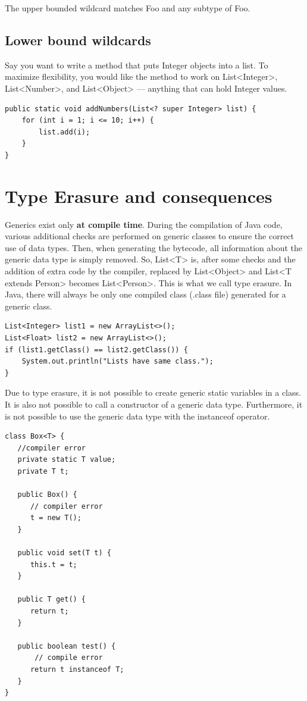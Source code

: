 The upper bounded wildcard matches Foo and any subtype of Foo.

\subsection{Lower bound wildcards}


Say you want to write a method that puts Integer objects into a list. To maximize flexibility, you would like the method to work on List<Integer>, List<Number>, and List<Object> — anything that can hold Integer values.

\begin{lstlisting}
public static void addNumbers(List<? super Integer> list) {
    for (int i = 1; i <= 10; i++) {
        list.add(i);
    }
}
\end{lstlisting}


\section{Type Erasure and consequences}

Generics exist only \textbf{at compile time}. During the compilation of Java code,  various additional checks are performed on generic classes to ensure the correct use of data types. Then, when generating the bytecode, all information about the generic data type is simply removed. So,  List<T> is, after some checks and the addition of extra code by the compiler, replaced by List<Object> and List<T extends Person> becomes List<Person>. This is what we call type erasure.  In Java, there will always be only one compiled class (.class file) generated for a generic class.

\begin{lstlisting}
List<Integer> list1 = new ArrayList<>();
List<Float> list2 = new ArrayList<>();
if (list1.getClass() == list2.getClass()) {
	System.out.println("Lists have same class.");
}
\end{lstlisting}

Due to type erasure, it is not possible to create generic static variables in a class. It is also not possible to call a constructor of a generic data type. Furthermore, it is not possible to use the generic data type with the instanceof operator.

\begin{lstlisting}
class Box<T> {
   //compiler error
   private static T value;
   private T t;
   
   public Box() {
      // compiler error
   	  t = new T();
   }

   public void set(T t) {
      this.t = t;
   }

   public T get() {
      return t;
   } 
   
   public boolean test() {
       // compile error
	  return t instanceof T;
   }  
}
\end{lstlisting}

